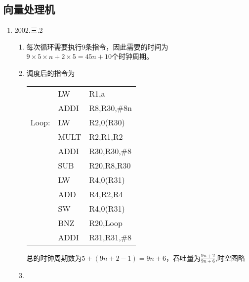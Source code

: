 \documentclass[a4paper]{ctexart}
\begin{document}
\subsection{向量处理机}
\begin{enumerate}
  \item 2002.三.2
  \begin{enumerate}
    \item 每次循环需要执行9条指令，因此需要的时间为$9\times 5\times n+2\times 5=45n+10$个时钟周期。
    \item 调度后的指令为
    \begin{table}[!htbp]
      \centering
      \begin{tabular}{lll}
        &LW & R1,a \\
        &ADDI & R8,R30,\#8n \\
        Loop:&LW & R2,0(R30) \\
        & MULT & R2,R1,R2 \\
        & ADDI & R30,R30,\#8 \\
        & SUB & R20,R8,R30 \\
        & LW & R4,0(R31) \\
        & ADD & R4,R2,R4 \\
        & SW & R4,0(R31) \\
        & BNZ & R20,Loop \\
        & ADDI & R31,R31,\#8 \\
      \end{tabular}
    \end{table}
    总的时钟周期数为$5+(9n+2-1)=9n+6$，吞吐量为$\frac{9n+2}{9n+6}$,时空图略
    \item     
  \end{enumerate}
\end{enumerate}
\end{document}
